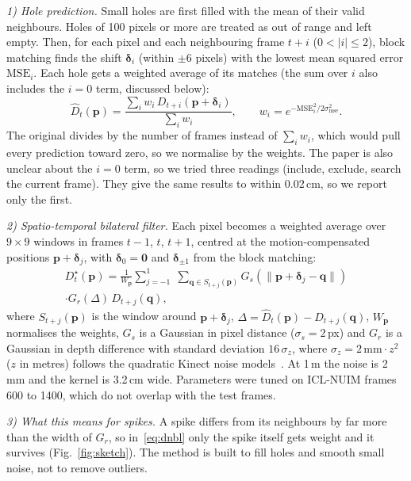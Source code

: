 \documentclass[conference]{IEEEtran}
\begin{document}
\emph{1) Hole prediction.} Small holes are first filled with the mean of
their valid neighbours. Holes of 100 pixels or more are treated as out of
range and left empty. Then, for each pixel and each neighbouring frame
$t+i$ ($0<|i|\le2$), block matching finds the shift $\boldsymbol{\delta}_i$
(within $\pm6$ pixels) with the lowest mean squared error $\mathrm{MSE}_i$.
Each hole gets a weighted average of its matches (the sum over $i$ also
includes the $i=0$ term, discussed below):
\begin{equation}
\hat{D}_t(\mathbf{p}) =
\frac{\sum_{i} w_i\, D_{t+i}(\mathbf{p}+\boldsymbol{\delta}_i)}{\sum_{i} w_i},\qquad
w_i = e^{-\mathrm{MSE}_i^2/2\sigma_{\mathrm{mse}}^2}.
\label{eq:predict}
\end{equation}
The original divides by the number of frames instead of $\sum_i w_i$, which
would pull every prediction toward zero, so we normalise by the weights. The
paper is also unclear about the $i=0$ term, so we tried three readings
(include, exclude, search the current frame). They give the same results to
within 0.02\,cm, so we report only the first.

\emph{2) Spatio-temporal bilateral filter.} Each pixel becomes a weighted
average over $9\times9$ windows in frames $t-1$, $t$, $t+1$, centred at the
motion-compensated positions $\mathbf{p}+\boldsymbol{\delta}_j$, with
$\boldsymbol{\delta}_0=\mathbf{0}$ and $\boldsymbol{\delta}_{\pm1}$ from the
block matching:
\begin{multline}
D^\star_t(\mathbf{p}) = \frac{1}{W_\mathbf{p}}\sum_{j=-1}^{1}\;\sum_{\mathbf{q}\in S_{t+j}(\mathbf{p})}
G_s(\lVert\mathbf{p}+\boldsymbol{\delta}_j-\mathbf{q}\rVert)\\
\cdot G_r(\Delta)\, D_{t+j}(\mathbf{q}),
\label{eq:dnbl}
\end{multline}
where $S_{t+j}(\mathbf{p})$ is the window around
$\mathbf{p}+\boldsymbol{\delta}_j$, $\Delta=\hat{D}_t(\mathbf{p})-D_{t+j}(\mathbf{q})$,
$W_\mathbf{p}$ normalises the weights, $G_s$ is a Gaussian in pixel distance
($\sigma_s=2$\,px) and $G_r$ is a Gaussian in depth difference with standard
deviation $16\,\sigma_z$, where $\sigma_z = 2\,\mathrm{mm}\cdot z^2$ ($z$ in
metres) follows the quadratic Kinect noise
models~\cite{khoshelham2012accuracy,nguyen2012modeling}. At 1\,m the noise is
2\,mm and the kernel is 3.2\,cm wide. Parameters were tuned on ICL-NUIM frames 600 to 1400, which
do not overlap with the test frames.

\emph{3) What this means for spikes.} A spike differs from its neighbours by
far more than the width of $G_r$, so in~\eqref{eq:dnbl} only the spike itself
gets weight and it survives (Fig.~\ref{fig:sketch}). The method is built to
fill holes and smooth small noise, not to remove outliers.
\end{document}
